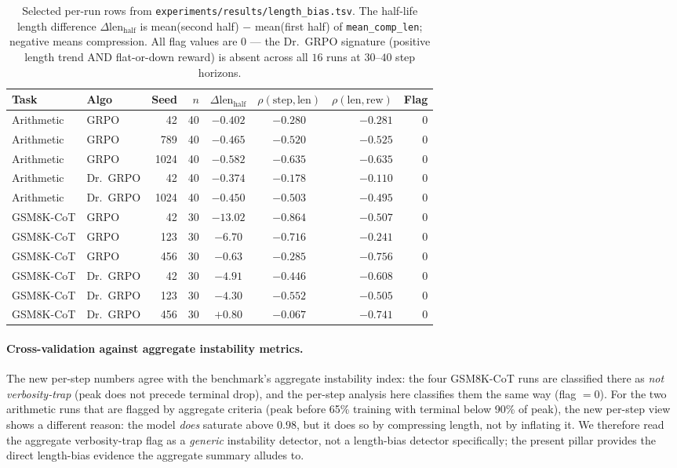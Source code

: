 \begin{table}[htbp]
\centering
\small
\begin{tabular}{llrrccrr}
\toprule
Task & Algo & Seed & $n$ & $\Delta\text{len}_\text{half}$
   & $\rho(\text{step},\text{len})$ & $\rho(\text{len},\text{rew})$
   & Flag \\
\midrule
Arithmetic   & GRPO     & 42    & 40 & $-0.402$ & $-0.280$  & $-0.281$ & 0 \\
Arithmetic   & GRPO     & 789   & 40 & $-0.465$ & $-0.520$  & $-0.525$ & 0 \\
Arithmetic   & GRPO     & 1024  & 40 & $-0.582$ & $-0.635$  & $-0.635$ & 0 \\
Arithmetic   & Dr.~GRPO & 42    & 40 & $-0.374$ & $-0.178$  & $-0.110$ & 0 \\
Arithmetic   & Dr.~GRPO & 1024  & 40 & $-0.450$ & $-0.503$  & $-0.495$ & 0 \\
GSM8K-CoT    & GRPO     & 42    & 30 & $-13.02$ & $-0.864$  & $-0.507$ & 0 \\
GSM8K-CoT    & GRPO     & 123   & 30 & $-6.70$  & $-0.716$  & $-0.241$ & 0 \\
GSM8K-CoT    & GRPO     & 456   & 30 & $-0.63$  & $-0.285$  & $-0.756$ & 0 \\
GSM8K-CoT    & Dr.~GRPO & 42    & 30 & $-4.91$  & $-0.446$  & $-0.608$ & 0 \\
GSM8K-CoT    & Dr.~GRPO & 123   & 30 & $-4.30$  & $-0.552$  & $-0.505$ & 0 \\
GSM8K-CoT    & Dr.~GRPO & 456   & 30 & $+0.80$  & $-0.067$  & $-0.741$ & 0 \\
\bottomrule
\end{tabular}
\caption{Selected per-run rows from \texttt{experiments/results/length\_bias.tsv}. The
half-life length difference $\Delta\text{len}_\text{half}$ is mean(second half) $-$
mean(first half) of \texttt{mean\_comp\_len}; negative means compression. All flag values
are $0$ --- the Dr.~GRPO signature (positive length trend AND flat-or-down reward) is absent
across all $16$ runs at $30$--$40$ step horizons.}
\label{tab:length-bias-per-run}
\end{table}

\paragraph{Cross-validation against aggregate instability metrics.}
The new per-step numbers agree with the benchmark's aggregate instability index:
the four GSM8K-CoT runs are classified there as
\emph{not verbosity-trap} (peak does not precede terminal drop),
and the per-step analysis here classifies them the same way
(flag $=0$). For the two arithmetic runs that are flagged by
aggregate criteria (peak before 65\% training with terminal below 90\% of
peak), the new per-step view shows a different reason: the model
\emph{does} saturate above $0.98$, but it does so by compressing
length, not by inflating it. We therefore read the aggregate verbosity-trap
flag as a \emph{generic} instability detector, not a length-bias
detector specifically; the present pillar provides the direct
length-bias evidence the aggregate summary alludes to.


